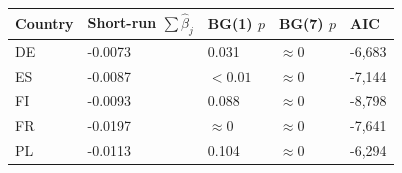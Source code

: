 
\begin{tabular}{lllll}
\toprule
Country & Short-run $\sum \hat{\beta}_j$ & BG(1) $p$ & BG(7) $p$ & AIC\\
\midrule
DE & -0.0073 & 0.031 & $\approx 0$ & -6,683\\
ES & -0.0087 & $<0.01$ & $\approx 0$ & -7,144\\
FI & -0.0093 & 0.088 & $\approx 0$ & -8,798\\
FR & -0.0197 & $\approx 0$ & $\approx 0$ & -7,641\\
PL & -0.0113 & 0.104 & $\approx 0$ & -6,294\\
\bottomrule
\end{tabular}
